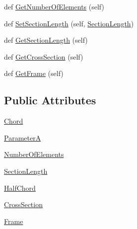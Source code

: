\begin{DoxyCompactItemize}
\item 
def \hyperlink{classgebtaero_1_1_wing_section_1_1_wing_section_a04c09389662d9c6d3cc34032296dd03e}{Get\+Number\+Of\+Elements} (self)
\item 
def \hyperlink{classgebtaero_1_1_wing_section_1_1_wing_section_ab34adcbd5dd0ad028a03fa6e3581afef}{Set\+Section\+Length} (self, \hyperlink{classgebtaero_1_1_wing_section_1_1_wing_section_a87909d32978a886e9e329df69f7d918e}{Section\+Length})
\item 
def \hyperlink{classgebtaero_1_1_wing_section_1_1_wing_section_a55b1955062f73aea55c508427f9491bf}{Get\+Section\+Length} (self)
\item 
def \hyperlink{classgebtaero_1_1_wing_section_1_1_wing_section_aa8304c2d733dc66fba50fcb4b3f4a902}{Get\+Cross\+Section} (self)
\item 
def \hyperlink{classgebtaero_1_1_wing_section_1_1_wing_section_a8b0b0e7224ca8bd3b39dbb4fb159274e}{Get\+Frame} (self)
\end{DoxyCompactItemize}
\subsection*{Public Attributes}
\begin{DoxyCompactItemize}
\item 
\hyperlink{classgebtaero_1_1_wing_section_1_1_wing_section_a844f4ac911b02212eb5c8a3d04bc2626}{Chord}
\item 
\hyperlink{classgebtaero_1_1_wing_section_1_1_wing_section_a0da2330696a15bce08b3ac29b2efaf17}{ParameterA}
\item 
\hyperlink{classgebtaero_1_1_wing_section_1_1_wing_section_a350cd9770457b51a9fc2d8c5a1171bf0}{Number\+Of\+Elements}
\item 
\hyperlink{classgebtaero_1_1_wing_section_1_1_wing_section_a87909d32978a886e9e329df69f7d918e}{Section\+Length}
\item 
\hyperlink{classgebtaero_1_1_wing_section_1_1_wing_section_a6b0d6833d40f1de17a90670b2d93f1d7}{Half\+Chord}
\item 
\hyperlink{classgebtaero_1_1_wing_section_1_1_wing_section_a66c05b18f3b13c9ab00815cb938fed49}{Cross\+Section}
\item 
\hyperlink{classgebtaero_1_1_wing_section_1_1_wing_section_a33e1121a1f998bf192ab4bb39d22d76a}{Frame}
\end{DoxyCompactItemize}


